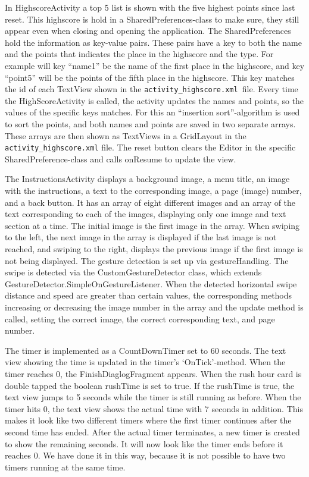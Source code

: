 In HighscoreActivity a top 5 list is shown with the five highest points since last reset. This highscore is hold in a SharedPreferences-class to make sure, they still appear even when closing and opening the application. The SharedPreferences hold the information as key-value pairs. These pairs have a key to both the name and the points that indicates the place in the highscore and the type. For example will key “name1” be the name of the first place in the highscore, and key “point5” will be the points of the fifth place in the highscore. This key matches the id of each TextView shown in the \verb|activity_highscore.xml |file. Every time the HighScoreActivity is called, the activity updates the names and points, so the values of the specific keys matches. For this an “insertion sort”-algorithm is used to sort the points, and both names and points are saved in two separate arrays. These arrays are then shown as TextViews in a GridLayout in the  \verb|activity_highscore.xml| file.
The reset button clears the Editor in the specific SharedPreference-class and calls onResume to update the view. \newline

The InstructionsActivity displays a background image, a menu title, an image with the instructions, a text to the corresponding image, a page (image) number, and a back button. It has an array of eight different images and an array of the text corresponding to each of the images, displaying only one image and text section at a time. The initial image is the first image in the array. When swiping to the left, the next image in the array is displayed if the last image is not reached, and swiping to the right, displays the previous image if the first image is not being displayed. The gesture detection is set up via gestureHandling. The swipe is detected via the CustomGestureDetector class, which extends GestureDetector.SimpleOnGestureListener. When the detected horizontal swipe distance and speed are greater than certain values, the corresponding methods increasing or decreasing the image number in the array and the update method is called, setting the correct image, the correct corresponding text, and page number. \newline

The timer is implemented as a CountDownTimer set to 60 seconds. The text view showing the time is updated in the timer’s ‘OnTick’-method.  When the timer reaches 0, the FinishDiaglogFragment appears. When the rush hour card is double tapped the boolean rushTime is set to true. If the rushTime is true, the text view jumps to 5 seconds while the timer is still running as before. When the timer hits 0, the text view shows the actual time with 7 seconds in addition. This makes it look like two different timers where the first timer continues after the second time has ended. After the actual timer terminates, a new timer is created to show the remaining seconds. It will now look like the timer ends before it reaches 0. We have done it in this way, because it is not possible to have two timers running at the same time. 


